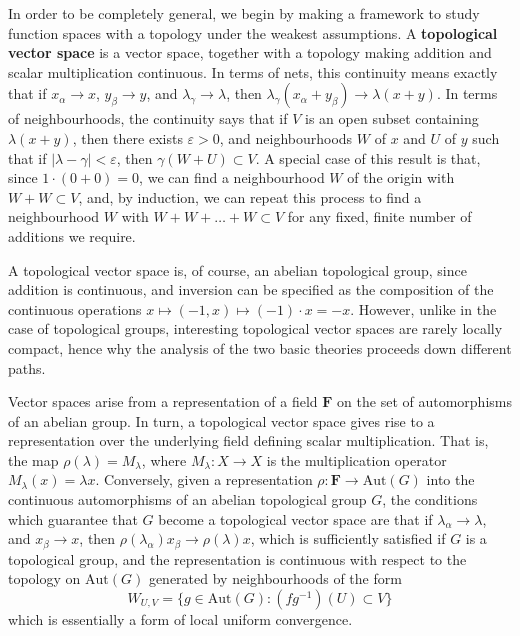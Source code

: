 In order to be completely general, we begin by making a framework to study function spaces with a topology under the weakest assumptions. A {\bf topological vector space} is a vector space, together with a topology making addition and scalar multiplication continuous. In terms of nets, this continuity means exactly that if $x_\alpha \to x$, $y_\beta \to y$, and $\lambda_\gamma \to \lambda$, then $\lambda_\gamma (x_\alpha + y_\beta) \to \lambda (x + y)$. In terms of neighbourhoods, the continuity says that if $V$ is an open subset containing $\lambda(x + y)$, then there exists $\varepsilon > 0$, and neighbourhoods $W$ of $x$ and $U$ of $y$ such that if $|\lambda - \gamma| < \varepsilon$, then $\gamma(W + U) \subset V$. A special case of this result is that, since $1 \cdot (0 + 0) = 0$, we can find a neighbourhood $W$ of the origin with $W + W \subset V$, and, by induction, we can repeat this process to find a neighbourhood $W$ with $W + W + \dots + W \subset V$ for any fixed, finite number of additions we require.

\begin{remark}
    A topological vector space is, of course, an abelian topological group, since addition is continuous, and inversion can be specified as the composition of the continuous operations $x \mapsto (-1,x) \mapsto (-1) \cdot x = -x$. However, unlike in the case of topological groups, interesting topological vector spaces are rarely locally compact, hence why the analysis of the two basic theories proceeds down different paths.
\end{remark}

Vector spaces arise from a representation of a field $\mathbf{F}$ on the set of automorphisms of an abelian group. In turn, a topological vector space gives rise to a representation over the underlying field defining scalar multiplication. That is, the map $\rho(\lambda) = M_\lambda$, where $M_\lambda: X \to X$ is the multiplication operator $M_\lambda(x) = \lambda x$. Conversely, given a representation $\rho: \mathbf{F} \to \text{Aut}(G)$ into the continuous automorphisms of an abelian topological group $G$, the conditions which guarantee that $G$ become a topological vector space are that if $\lambda_\alpha \to \lambda$, and $x_\beta \to x$, then $\rho(\lambda_\alpha) x_\beta \to \rho(\lambda) x$, which is sufficiently satisfied if $G$ is a topological group, and the representation is continuous with respect to the topology on $\text{Aut}(G)$ generated by neighbourhoods of the form
%
\[ W_{U,V} = \{ g \in \text{Aut}(G) : (fg^{-1})(U) \subset V \} \]
%
which is essentially a form of local uniform convergence.

